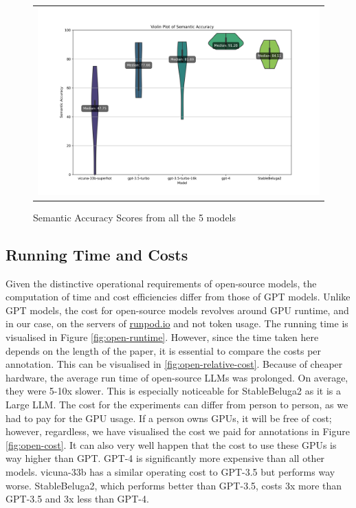 \begin{figure}[htpb]
  \centering
  \begin{tabular}{c}
  \includegraphics[width=14cm]{images/open-semantic.png}
  \end{tabular}
  \caption[Semantic Accuracy]{Semantic Accuracy Scores from all the 5 models}\label{fig:open-semantic}
\end{figure}

\subsection{Running Time and Costs}

Given the distinctive operational requirements of open-source models, the computation of time and cost efficiencies differ from those of GPT models. Unlike GPT models, the cost for open-source models revolves around GPU runtime, and in our case, on the servers of \href{https://runpod.io}{runpod.io} and not token usage. The running time is visualised in Figure \ref{fig:open-runtime}. However, since the time taken here depends on the length of the paper, it is essential to compare the costs per annotation. This can be visualised in \ref{fig:open-relative-cost}. Because of cheaper hardware, the average run time of open-source LLMs was prolonged. On average, they were 5-10x slower. This is especially noticeable for StableBeluga2 as it is a Large LLM. The cost for the experiments can differ from person to person, as we had to pay for the GPU usage. If a person owns GPUs, it will be free of cost; however, regardless, we have visualised the cost we paid for annotations in Figure \ref{fig:open-cost}. It can also very well happen that the cost to use these GPUs is way higher than GPT. GPT-4 is significantly more expensive than all other models. vicuna-33b has a similar operating cost to GPT-3.5 but performs way worse. StableBeluga2, which performs better than GPT-3.5, costs 3x more than GPT-3.5 and 3x less than GPT-4.

